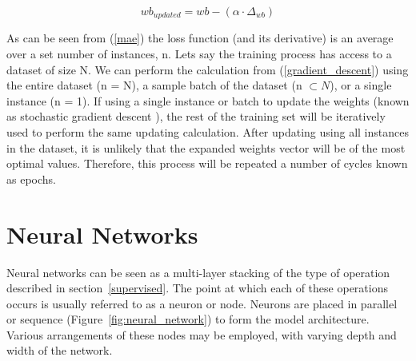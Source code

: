  \begin{equation} \label{gradient_descent}
 	wb_{updated} = wb - (\alpha \cdot \Delta_{wb})
 \end{equation}
 
 \noindent
As can be seen from (\ref{mae}) the loss function (and its derivative) is an average over a set number of instances, n. Lets say the training process has access to a dataset of size N. We can perform the calculation from (\ref{gradient_descent})  using the entire dataset (n = N), a sample batch of the dataset (n $\subset N$), or a single instance (n = 1). If using a single instance or batch to update the weights (known as stochastic gradient descent \cite{ketkar2017stochastic}), the rest of the training set will be iteratively used to perform the same updating calculation. After updating using all instances in the dataset, it is unlikely that the expanded weights vector will be of the most optimal values.  Therefore, this process will be repeated a number of cycles known as epochs.


 	
 	
 	
		
		
		
		
		
 		

\section{Neural Networks} \label{NN}

Neural networks can be seen as a multi-layer stacking of the type of operation described in section~\ref{supervised}. The point at which each of these operations occurs is usually referred to as a neuron or node. Neurons are placed in parallel or sequence (Figure~\ref{fig:neural_network}) to form the model architecture. Various arrangements of these nodes may be employed, with varying depth and width of the network. 
\\

